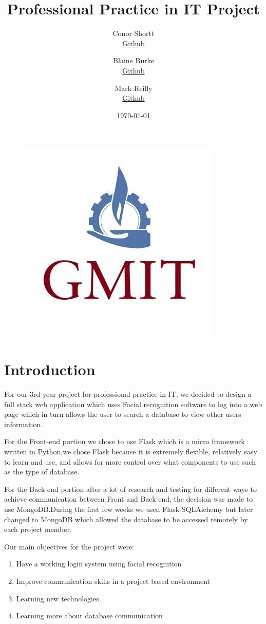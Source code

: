 \documentclass{article}
\title{Professional Practice in IT Project}
\author{
  Conor Shortt\\
  \href{https://github.com/conorshortt123}{Github}
  \and
  Blaine Burke\\
  \href{https://github.com/BurkeBlaine1999}{Github}
  \and
  Mark Reilly\\
  \href{https://github.com/MarkReillyGMIT}{Github}
}
\date{\today}
\begin{document}
\begin{figure}
    \centering
    \includegraphics[scale=0.3]{gmit}
\end{figure}

\maketitle


\tableofcontents
\newpage


\section{Introduction}
For our 3rd year project for professional practice in IT, we decided to design a full stack web application which uses Facial recognition software to log into a web page which
in turn allows the user to search a database to view other users information.\medskip

For the Front-end portion we chose to use Flask which is a micro framework written in Python,we chose Flask because it is extremely flexible, relatively easy to learn and use, and allows for more control over what components to use such as the type of database.\medskip

For the Back-end portion after a lot of research and testing for different ways to achieve communication between Front and Back end, the decision was made to use MongoDB.During the first few weeks we used Flask-SQLAlchemy but later changed to MongoDB which allowed the database to be accessed remotely by each project member.\medskip

Our main objectives for the project were:
\begin{enumerate}
\item Have a working login system using facial recognition
\item Improve communication skills in a project based environment 
\item Learning new technologies
\item Learning more about database communication
\end{enumerate}
\end{document}

